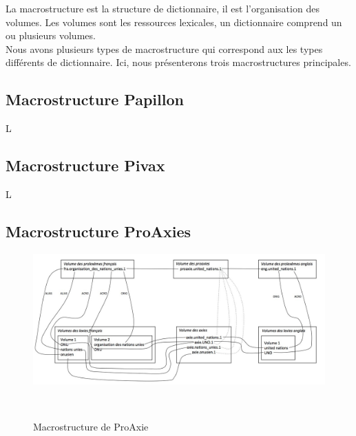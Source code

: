 \documentclass[10pt,a4paper,twoside]{article}
\begin{document}
La macrostructure est la structure de dictionnaire, il est l’organisation des volumes. Les volumes sont les ressources lexicales, un dictionnaire comprend un ou plusieurs volumes.\\
Nous avons plusieurs types de macrostructure qui correspond aux les types différents de dictionnaire.  Ici, nous présenterons trois macrostructures principales.\\

\subsection{Macrostructure Papillon}

L \cite{GSMM01a}

\subsection{Macrostructure Pivax}

L \cite{MMHTN09}

\subsection{Macrostructure ProAxies}

\begin{figure}[htbp] 
\begin{center} 
\includegraphics[width=14cm]{images/proaxie.jpg}
\end{center} 
\caption{Macrostructure de ProAxie} \label{image} \
\end{figure}
\end{document}
